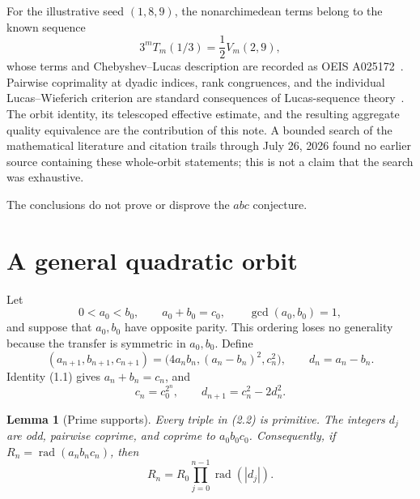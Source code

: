\documentclass[11pt]{article}
\newtheorem{lemma}[theorem]{Lemma}
\theoremstyle{remark}
\newcommand{\rad}{\operatorname{rad}}
\begin{document}
For the illustrative seed \((1,8,9)\), the nonarchimedean terms belong
to the known sequence
\[
 3^mT_m(1/3)=\frac12V_m(2,9),
\]
whose terms and Chebyshev--Lucas description are recorded as OEIS
A025172~\cite{OEIS-A025172}.  Pairwise coprimality at dyadic indices,
rank congruences, and the individual Lucas--Wieferich criterion are
standard consequences of Lucas-sequence
theory~\cite{Ribenboim2001,Sun2013}.  The orbit identity, its telescoped
effective estimate, and the resulting aggregate quality equivalence are
the contribution of this note.  A bounded search of the mathematical
literature and citation trails through July 26, 2026 found no earlier
source containing these whole-orbit statements; this is not a claim that
the search was exhaustive.

The conclusions do not prove or disprove the \(abc\) conjecture.

\section{A general quadratic orbit}

Let
\[
 0<a_0<b_0,\qquad a_0+b_0=c_0,\qquad \gcd(a_0,b_0)=1,
                                                               \tag{2.1}
\]
and suppose that \(a_0,b_0\) have opposite parity.  This ordering loses
no generality because the transfer is symmetric in \(a_0,b_0\).  Define
\[
 (a_{n+1},b_{n+1},c_{n+1})
   =\bigl(4a_nb_n,(a_n-b_n)^2,c_n^2\bigr),\qquad
 d_n=a_n-b_n.                                             \tag{2.2}
\]
Identity (1.1) gives \(a_n+b_n=c_n\), and
\[
 c_n=c_0^{2^n},\qquad d_{n+1}=c_n^2-2d_n^2.               \tag{2.3}
\]

\begin{lemma}[Prime supports]\label{lem:support}
Every triple in (2.2) is primitive.  The integers \(d_j\) are odd,
pairwise coprime, and coprime to \(a_0b_0c_0\).  Consequently, if
\(R_n=\rad(a_nb_nc_n)\), then
\[
 R_n=R_0\prod_{j=0}^{n-1}\rad(|d_j|).                     \tag{2.4}
\]
\end{lemma}
\end{document}
